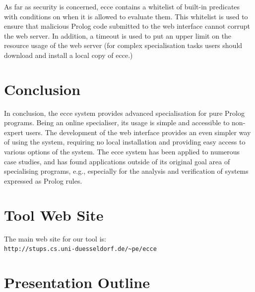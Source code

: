 \documentclass{sig-alternate}
\begin{document}
As far as security is concerned,
 {\sc ecce} contains a whitelist of built-in predicates with conditions on when it is allowed to evaluate them.
This whitelist is used to ensure that malicious Prolog code submitted to the web interface cannot corrupt the web server.
In addition, a timeout is used to put an upper limit on the resource usage of the web server (for complex specialisation
 tasks users should download and install a local copy of {\sc ecce}.)


\section{Conclusion}

In conclusion, the {\sc ecce}  system provides advanced specialisation for pure Prolog programs.
Being an online specialiser, its usage is simple and accessible to non-expert users. 
The development of the web interface provides an even simpler way of using the system,
 requiring no local installation and providing easy access to various options of the system.
The {\sc ecce} system has been applied to numerous case studies, and has found applications outside
 of its original goal area of specialising programs, e.g., especially for the analysis and verification of systems
  expressed as Prolog rules.
 




\appendix

\section{Tool Web Site}

\noindent
The main web site for our tool is:\\
{\small\tt http://stups.cs.uni-duesseldorf.de/\~{}pe/ecce}


\section{Presentation Outline}
\end{document}
